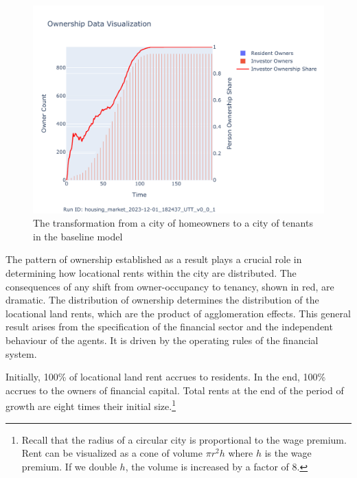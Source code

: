 \begin{figure}
    \centering
    \hspace{4cm} %
    \includegraphics[scale=0.8, trim={0 1cm 0 1.8cm}, clip]{fig/Analysis/Ownership_Data_1.pdf}
    \caption{The transformation from a city of homeowners to a city of tenants in the baseline model}
    \label{fig:Baseline_ownership_trajectory}
\end{figure}









The pattern of ownership established as a result plays a crucial role in determining how locational rents within the city are distributed. The consequences of any shift from owner-occupancy to tenancy, shown in red, are dramatic. 
The distribution of ownership determines the distribution of the locational land rents, which are the product of agglomeration effects. This general result arises from the specification of the financial sector and the independent behaviour of the agents. It is driven by the operating rules of the financial system. 

Initially, 100\% of locational land rent accrues to residents. In the end, 100\% accrues to the owners of financial capital. Total rents at the end of the period of growth are eight times their initial size.\footnote{Recall that the radius of a circular city is proportional to the wage premium. Rent can be visualized as a cone of volume $\pi r^2 h$ where $h$ is the wage premium. If we double $h$, the volume is increased by a factor of 8.}



